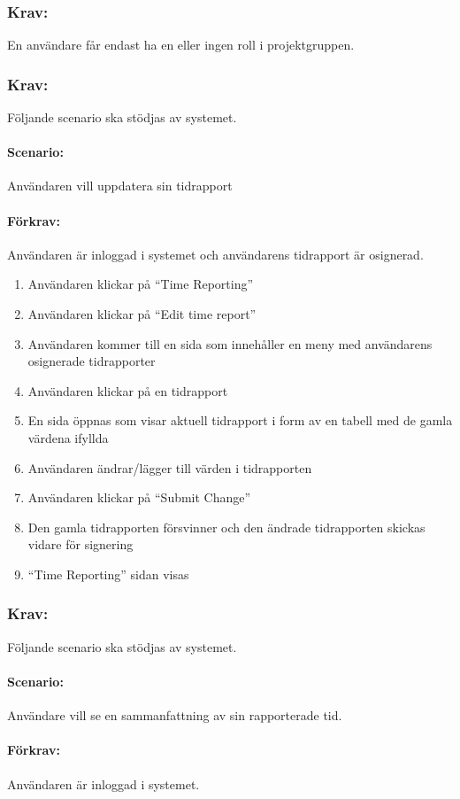 \documentclass[paper=a4, fontsize=11pt,twoside]{article}
\begin{document}
	\subsubsection{Krav:} En användare får endast ha en eller ingen roll i projektgruppen.
	\subsubsection{Krav:} Följande scenario ska stödjas av systemet.
	\paragraph{Scenario:} Användaren vill uppdatera sin tidrapport
	\paragraph{Förkrav:}
	Användaren är inloggad i systemet och användarens tidrapport är osignerad.
	\begin{enumerate}
		\item	Användaren klickar på “Time Reporting”
		\item	Användaren klickar på “Edit time report”
		\item	Användaren kommer till en sida som innehåller en meny med användarens osignerade tidrapporter
		\item 	Användaren klickar på en tidrapport
		\item	En sida öppnas som visar aktuell tidrapport i form av en tabell med de gamla värdena ifyllda
		\item	Användaren ändrar/lägger till värden i tidrapporten
		\item	Användaren klickar på “Submit Change”
		\item	Den gamla tidrapporten försvinner och den ändrade tidrapporten skickas vidare för signering
		\item	“Time Reporting” sidan visas
		
	\end{enumerate}
	\subsubsection{Krav:}Följande scenario ska stödjas av systemet.
	\paragraph{Scenario:}Användare vill se en sammanfattning av sin rapporterade tid.
	\paragraph{Förkrav:}
	Användaren är inloggad i systemet.
\end{document}
